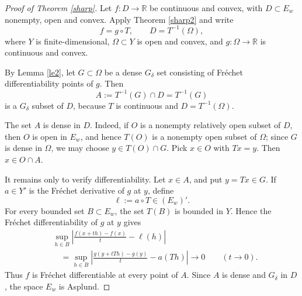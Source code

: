 \documentclass[12pt]{amsart}
\theoremstyle{plain}
\newtheorem{corollary}[theorem]{Corollary}
\theoremstyle{definition}
\theoremstyle{remark}
\def\R{{\mathbb R}}
\begin{document}
\begin{proof}[Proof of Theorem \ref{sharp}]
Let $f\colon D\to\R$ be continuous and convex, with $D\subset E_{w}$ nonempty, open and convex.  Apply Theorem \ref{sharp2} and write
\[
        f=g\circ T,
        \qquad
        D=T^{-1}(\Omega),
\]
where $Y$ is finite-dimensional, $\Omega\subset Y$ is open and convex, and $g\colon\Omega\to\R$ is continuous and convex.

By  Lemma \ref{le2}, let $G\subset\Omega$ be a dense $G_\delta$ set consisting of Fr\'echet differentiability points of $g$.  Then
\[
        A:=T^{-1}(G)\cap D=T^{-1}(G)
\]
is a $G_\delta$ subset of $D$, because $T$ is continuous and $D=T^{-1}(\Omega)$.

The set $A$ is dense in $D$.  Indeed, if $O$ is a nonempty relatively open subset of $D$, then $O$ is open in $E_{w}$, and hence $T(O)$ is a nonempty open subset of $\Omega$; since $G$ is dense in $\Omega$, we may choose $y\in T(O)\cap G$.  Pick $x\in O$ with $T x=y$.  Then $x\in O\cap A$.

It remains only to verify differentiability.  Let $x\in A$, and put $y=T x\in G$.  If $a\in Y'$ is the Fr\'echet derivative of $g$ at $y$, define
\[
        \ell:=a\circ T\in (E_{w})'.
\]
For every bounded set $B\subset E_{w}$, the set $T(B)$ is bounded in $Y$.  Hence the Fr\'echet differentiability of $g$ at $y$ gives
\[
\begin{aligned}
&\sup_{h\in B}
\left|\frac{f(x+t h)-f(x)}{t}-\ell(h)\right| \\
&\quad =
\sup_{h\in B}
\left|\frac{g(y+tT h)-g(y)}{t}-a(T h)\right|
\longrightarrow 0
\qquad (t\to0).
\end{aligned}
\]
Thus $f$ is Fr\'echet differentiable at every point of $A$.  Since $A$ is dense and $G_\delta$ in $D$, the space $E_{w}$ is Asplund.
\end{proof}
\end{document}
